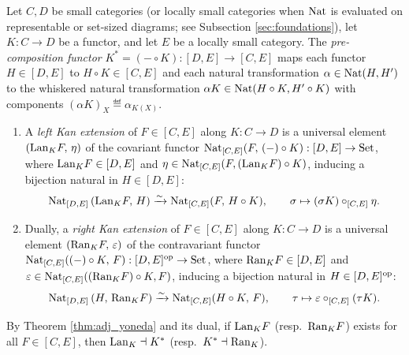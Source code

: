 \documentclass[10pt,a4paper]{article}
\begin{document}
\begin{definition}\label{def:kan_ext}
Let $C, D$ be small categories (or locally small categories when ${\textrm{Nat}}$ is evaluated on representable or set-sized diagrams; see Subsection \ref{sec:foundations}), let $K : C \to D$ be a functor, and let $E$ be a locally small category. The \emph{pre-composition functor} $K^* = (- \circ K) : [D, E] \to [C, E]$ maps each functor $H \in [D, E]$ to $H \circ K \in [C, E]$ and each natural transformation $\alpha \in {\textrm{Nat}}(H, H')$ to the whiskered natural transformation $\alpha K \in {\textrm{Nat}}(H \circ K, H' \circ K)$ with components $(\alpha K)_X \eqdef \alpha_{K(X)}$.
\begin{enumerate}
\item A \emph{left Kan extension} of $F \in [C, E]$ along $K : C \to D$ is a universal element $({\mathrm{Lan}}_K F,\, \eta)$ of the covariant functor ${\textrm{Nat}}_{[C,E]}(F,\, (-) \circ K) : [D, E] \to {\textrm{Set}}$, where ${\mathrm{Lan}}_K F \in [D, E]$ and $\eta \in {\textrm{Nat}}_{[C,E]}(F, ({\mathrm{Lan}}_K F) \circ K)$, inducing a bijection natural in $H \in [D, E]$:
$${\textrm{Nat}}_{[D,E]}\left({\mathrm{Lan}}_K F,\, H\right) \xrightarrow{\sim} {\textrm{Nat}}_{[C,E]}(F,\, H \circ K), \qquad \sigma \mapsto (\sigma K) \circ_{[C,E]} \eta.$$
\item Dually, a \emph{right Kan extension} of $F \in [C, E]$ along $K : C \to D$ is a universal element $({\mathrm{Ran}}_K F,\, \varepsilon)$ of the contravariant functor ${\textrm{Nat}}_{[C,E]}((-) \circ K,\, F) : [D, E]^{\textrm{op}} \to {\textrm{Set}}$, where ${\mathrm{Ran}}_K F \in [D, E]$ and $\varepsilon \in {\textrm{Nat}}_{[C,E]}(({\mathrm{Ran}}_K F) \circ K, F)$, inducing a bijection natural in $H \in [D, E]^{\textrm{op}}$:
$${\textrm{Nat}}_{[D,E]}\left(H,\, {\mathrm{Ran}}_K F\right) \xrightarrow{\sim} {\textrm{Nat}}_{[C,E]}(H \circ K,\, F), \qquad \tau \mapsto \varepsilon \circ_{[C,E]} (\tau K).$$
\end{enumerate}
By Theorem \ref{thm:adj_yoneda} and its dual, if ${\mathrm{Lan}}_K F$ (resp.\ ${\mathrm{Ran}}_K F$) exists for all $F \in [C, E]$, then ${\mathrm{Lan}}_K \dashv K^*$ (resp.\ $K^* \dashv {\mathrm{Ran}}_K$).
\end{definition}
\end{document}

